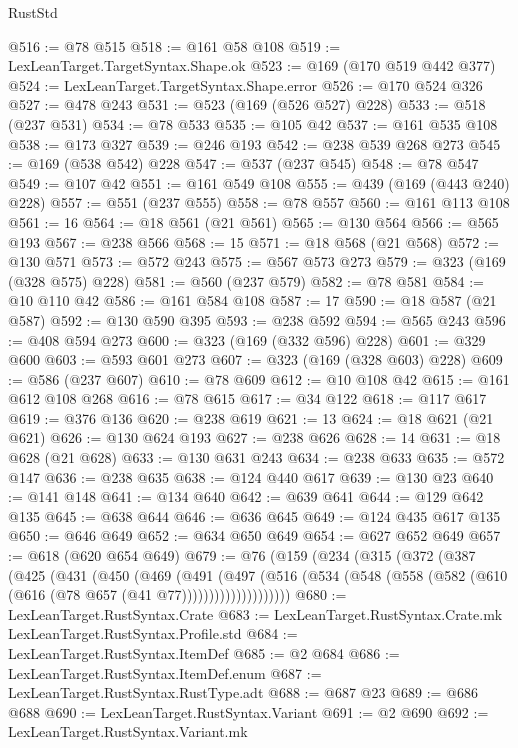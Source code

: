 \begin{lexlean}{RustStd}
\begin{coremodule}
@516 := @78 @515
@518 := @161 @58 @108
@519 := LexLeanTarget.TargetSyntax.Shape.ok
@523 := @169 (@170 @519 @442 @377)
@524 := LexLeanTarget.TargetSyntax.Shape.error
@526 := @170 @524 @326
@527 := @478 @243
@531 := @523 (@169 (@526 @527) @228)
@533 := @518 (@237 @531)
@534 := @78 @533
@535 := @105 @42
@537 := @161 @535 @108
@538 := @173 @327
@539 := @246 @193
@542 := @238 @539 @268 @273
@545 := @169 (@538 @542) @228
@547 := @537 (@237 @545)
@548 := @78 @547
@549 := @107 @42
@551 := @161 @549 @108
@555 := @439 (@169 (@443 @240) @228)
@557 := @551 (@237 @555)
@558 := @78 @557
@560 := @161 @113 @108
@561 := 16
@564 := @18 @561 (@21 @561)
@565 := @130 @564
@566 := @565 @193
@567 := @238 @566
@568 := 15
@571 := @18 @568 (@21 @568)
@572 := @130 @571
@573 := @572 @243
@575 := @567 @573 @273
@579 := @323 (@169 (@328 @575) @228)
@581 := @560 (@237 @579)
@582 := @78 @581
@584 := @10 @110 @42
@586 := @161 @584 @108
@587 := 17
@590 := @18 @587 (@21 @587)
@592 := @130 @590 @395
@593 := @238 @592
@594 := @565 @243
@596 := @408 @594 @273
@600 := @323 (@169 (@332 @596) @228)
@601 := @329 @600
@603 := @593 @601 @273
@607 := @323 (@169 (@328 @603) @228)
@609 := @586 (@237 @607)
@610 := @78 @609
@612 := @10 @108 @42
@615 := @161 @612 @108 @268
@616 := @78 @615
@617 := @34 @122
@618 := @117 @617
@619 := @376 @136
@620 := @238 @619
@621 := 13
@624 := @18 @621 (@21 @621)
@626 := @130 @624 @193
@627 := @238 @626
@628 := 14
@631 := @18 @628 (@21 @628)
@633 := @130 @631 @243
@634 := @238 @633
@635 := @572 @147
@636 := @238 @635
@638 := @124 @440 @617
@639 := @130 @23
@640 := @141 @148
@641 := @134 @640
@642 := @639 @641
@644 := @129 @642 @135
@645 := @638 @644
@646 := @636 @645
@649 := @124 @435 @617 @135
@650 := @646 @649
@652 := @634 @650 @649
@654 := @627 @652 @649
@657 := @618 (@620 @654 @649)
@679 := @76
    (@159
      (@234
        (@315
          (@372
            (@387
              (@425
                (@431
                  (@450
                    (@469
                      (@491
                        (@497
                          (@516
                            (@534
                              (@548 (@558 (@582 (@610 (@616 (@78 @657 (@41 @77))))))))))))))))))))
@680 := LexLeanTarget.RustSyntax.Crate
@683 := LexLeanTarget.RustSyntax.Crate.mk LexLeanTarget.RustSyntax.Profile.std
@684 := LexLeanTarget.RustSyntax.ItemDef
@685 := @2 @684
@686 := LexLeanTarget.RustSyntax.ItemDef.enum
@687 := LexLeanTarget.RustSyntax.RustType.adt
@688 := @687 @23
@689 := @686 @688
@690 := LexLeanTarget.RustSyntax.Variant
@691 := @2 @690
@692 := LexLeanTarget.RustSyntax.Variant.mk

\end{coremodule}
\end{lexlean}
